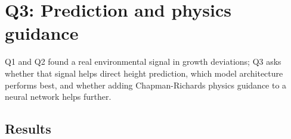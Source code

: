 %

\section{Q3: Prediction and physics guidance}
\label{sec:results-q3}

Q1 and Q2 found a real environmental signal in growth deviations; Q3 asks whether that signal
helps direct height prediction, which model architecture performs best, and whether adding
Chapman-Richards physics guidance to a neural network helps further.

\subsection{Results}


